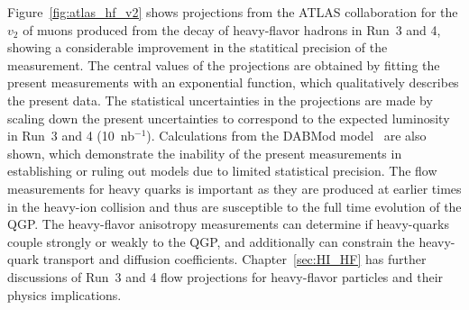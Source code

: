 Figure~\ref{fig:atlas_hf_v2} shows projections from the ATLAS collaboration
  for the $v_2$ of muons produced from the decay of heavy-flavor hadrons
  in Run~3 and 4, showing a considerable improvement in the statitical 
  precision of the measurement.
The central values of the projections are obtained by fitting the 
  present measurements with an exponential function, which qualitatively 
  describes the present data. 
The statistical uncertainties in the projections are made by scaling down 
  the present uncertainties to correspond to the expected luminosity in 
  Run~3 and 4 (10~nb$^{-1}$).
Calculations from the DABMod model~\cite{Prado:2016szr} are also shown,
  which demonstrate the inability of the present measurements
  in establishing or ruling out models due to limited statistical precision.
The flow measurements for heavy quarks is important as they are produced at
  earlier times in the heavy-ion collision and thus are susceptible
  to the full time evolution of the QGP.
The heavy-flavor anisotropy measurements can determine if heavy-quarks couple 
  strongly or weakly to the QGP, and additionally can constrain the heavy-quark 
  transport and diffusion coefficients.
Chapter~\ref{sec:HI_HF} has further discussions of Run~3 and 4 flow projections
  for heavy-flavor particles and their physics implications. 



